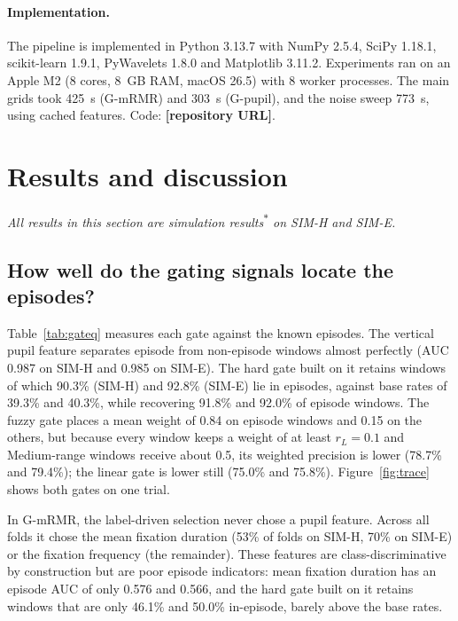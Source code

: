 \documentclass[11pt,a4paper]{article}
\newcommand{\pending}[1]{\textcolor{red!75!black}{\textbf{[#1]}}}
\newcommand{\simnote}{\textsuperscript{$\ast$}}
\begin{document}
\paragraph{Implementation.} The pipeline is implemented in Python 3.13.7 with NumPy 2.5.4, SciPy 1.18.1, scikit-learn 1.9.1, PyWavelets 1.8.0 and Matplotlib 3.11.2. Experiments ran on an Apple M2 (8 cores, 8~GB RAM, macOS 26.5) with 8 worker processes. The main grids took 425~s (G-mRMR) and 303~s (G-pupil), and the noise sweep 773~s, using cached features. Code: \pending{repository URL}.

\section{Results and discussion}
\label{sec:results}

\noindent\emph{All results in this section are simulation results\simnote{} on SIM-H and SIM-E.}

\subsection{How well do the gating signals locate the episodes?}
Table~\ref{tab:gateq} measures each gate against the known episodes. The vertical pupil feature separates episode from non-episode windows almost perfectly (AUC 0.987 on SIM-H and 0.985 on SIM-E). The hard gate built on it retains windows of which 90.3\% (SIM-H) and 92.8\% (SIM-E) lie in episodes, against base rates of 39.3\% and 40.3\%, while recovering 91.8\% and 92.0\% of episode windows. The fuzzy gate places a mean weight of 0.84 on episode windows and 0.15 on the others, but because every window keeps a weight of at least $r_L=0.1$ and Medium-range windows receive about 0.5, its weighted precision is lower (78.7\% and 79.4\%); the linear gate is lower still (75.0\% and 75.8\%). Figure~\ref{fig:trace} shows both gates on one trial.

In G-mRMR, the label-driven selection never chose a pupil feature. Across all folds it chose the mean fixation duration (53\% of folds on SIM-H, 70\% on SIM-E) or the fixation frequency (the remainder). These features are class-discriminative by construction but are poor episode indicators: mean fixation duration has an episode AUC of only 0.576 and 0.566, and the hard gate built on it retains windows that are only 46.1\% and 50.0\% in-episode, barely above the base rates.

\begin{table}[t]
\centering\scriptsize
\caption{Gate quality against the known episodes\simnote{} (all 900 windows per dataset). w-prec.: weighted precision}\label{tab:gateq}

\end{table}
\end{document}
